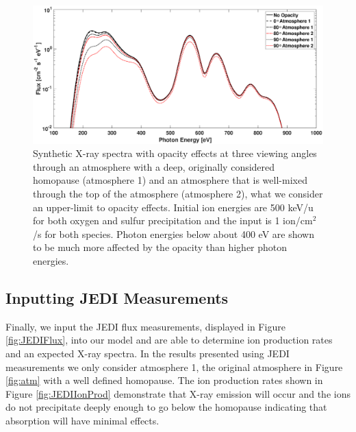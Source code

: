 \documentclass[draft]{agujournal2018}
\begin{document}
\begin{figure}[ht]
    \centering
    \includegraphics[width=\textwidth]{Figures/OpacityATM1ATM2.eps}
    \caption{Synthetic X-ray spectra with opacity effects at three viewing angles through an atmosphere with a deep, originally considered homopause (atmosphere 1) and an atmosphere that is well-mixed through the top of the atmosphere (atmosphere 2), what we consider an upper-limit to opacity effects. Initial ion energies are 500 keV/u for both oxygen and sulfur precipitation and the input is 1 ion/cm$^2$/s for both species. Photon energies below about 400 eV are shown to be much more affected by the opacity than higher photon energies.}
    \label{fig:XraySpecOpac}
\end{figure}

\subsection{Inputting JEDI Measurements}

Finally, we input the JEDI flux measurements, displayed in Figure \ref{fig:JEDIFlux}, into our model and are able to determine ion production rates and an expected X-ray spectra.
In the results presented using JEDI measurements we only consider atmosphere 1, the original atmosphere in Figure \ref{fig:atm} with a well defined homopause.
The ion production rates shown in Figure \ref{fig:JEDIIonProd} demonstrate that X-ray emission will occur and the ions do not precipitate deeply enough to go below the homopause indicating that absorption will have minimal effects.
\end{document}
